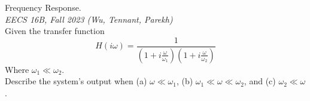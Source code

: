 \documentclass[11pt]{article}
\theoremstyle{gangnamstyle}{\newtheorem{definition}{Definition}[]}
\theoremstyle{gangnamstyle}{\newtheorem{example}{Example}[]}
\theoremstyle{gangnamstyle}{\newtheorem{problem}{Problem}[]}
\theoremstyle{gangnamstyle}{\newtheorem{warning}{Warning}[]}
\begin{document}
\begin{problem}
Frequency Response. \\
\textit{EECS 16B, Fall 2023 (Wu, Tennant, Parekh)} \\
Given the transfer function
\[ H(i\omega) = \frac{1}{(1 + i\frac{\omega}{\omega_1})(1 + i\frac{\omega}{\omega_2})} \]
Where $\omega_1 \ll \omega_2$. \\
Describe the system's output when (a) $\omega \ll \omega_1$, (b) $\omega_1 \ll \omega \ll \omega_2$, and (c) $\omega_2 \ll \omega$. 
\end{problem}
\end{document}

